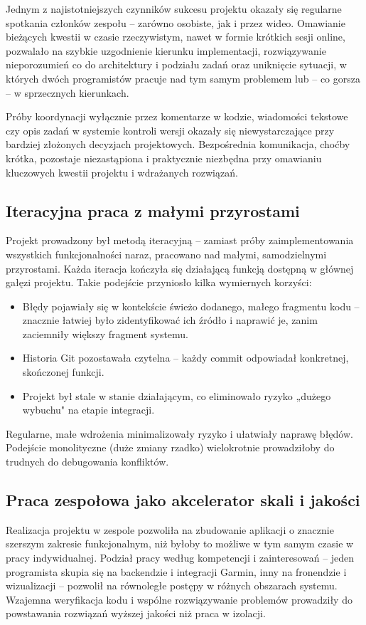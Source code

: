 \documentclass[12pt,a4paper]{report}
\begin{document}
Jednym z najistotniejszych czynników sukcesu projektu okazały się regularne spotkania członków zespołu -- zarówno osobiste, jak i przez wideo. Omawianie bieżących kwestii w czasie rzeczywistym, nawet w formie krótkich sesji online, pozwalało na szybkie uzgodnienie kierunku implementacji, rozwiązywanie nieporozumień co do architektury i podziału zadań oraz uniknięcie sytuacji, w których dwóch programistów pracuje nad tym samym problemem lub -- co gorsza -- w sprzecznych kierunkach.

Próby koordynacji wyłącznie przez komentarze w kodzie, wiadomości tekstowe czy opis zadań w systemie kontroli wersji okazały się niewystarczające przy bardziej złożonych decyzjach projektowych. Bezpośrednia komunikacja, choćby krótka, pozostaje niezastąpiona i praktycznie niezbędna przy omawianiu kluczowych kwestii projektu i wdrażanych rozwiązań.

\subsection{Iteracyjna praca z małymi przyrostami}

Projekt prowadzony był metodą iteracyjną -- zamiast próby zaimplementowania wszystkich funkcjonalności naraz, pracowano nad małymi, samodzielnymi przyrostami. Każda iteracja kończyła się działającą funkcją dostępną w głównej gałęzi projektu. Takie podejście przyniosło kilka wymiernych korzyści:
\begin{itemize}
    \item Błędy pojawiały się w kontekście świeżo dodanego, małego fragmentu kodu -- znacznie łatwiej było zidentyfikować ich źródło i naprawić je, zanim zaciemniły większy fragment systemu.
    \item Historia Git pozostawała czytelna -- każdy commit odpowiadał konkretnej, skończonej funkcji.
    \item Projekt był stale w stanie działającym, co eliminowało ryzyko „dużego wybuchu" na etapie integracji.
\end{itemize}
Regularne, małe wdrożenia minimalizowały ryzyko i ułatwiały naprawę błędów. Podejście monolityczne (duże zmiany rzadko) wielokrotnie prowadziłoby do trudnych do debugowania konfliktów.

\subsection{Praca zespołowa jako akcelerator skali i jakości}

Realizacja projektu w zespole pozwoliła na zbudowanie aplikacji o znacznie szerszym zakresie funkcjonalnym, niż byłoby to możliwe w tym samym czasie w pracy indywidualnej. Podział pracy według kompetencji i zainteresowań -- jeden programista skupia się na backendzie i integracji Garmin, inny na fronendzie i wizualizacji -- pozwolił na równoległe postępy w różnych obszarach systemu. Wzajemna weryfikacja kodu i wspólne rozwiązywanie problemów prowadziły do powstawania rozwiązań wyższej jakości niż praca w izolacji.
\end{document}
